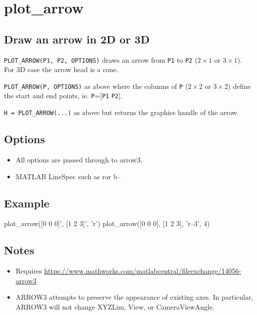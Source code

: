 \hypertarget{plot\_arrow}{\section*{plot\_arrow}}
\subsection*{Draw an arrow in 2D or 3D}


\texttt{PLOT\_ARROW(P1, P2, OPTIONS)} draws an arrow from \texttt{P1} to \texttt{P2} ($2 \times 1$ or $3 \times 1$).  For 3D
case the arrow head is a cone.



\texttt{PLOT\_ARROW(P, OPTIONS)} as above where the columns of \texttt{P} ($2 \times 2$ or $3 \times 2$) define the
start and end points, ie. \texttt{P}=[\texttt{P1} \texttt{P2}].



\texttt{H = PLOT\_ARROW(...)} as above but returns the graphics handle of the arrow.


\subsection*{Options}
\begin{itemize}
  \item All options are passed through to arrow3.
  \item MATLAB LineSpec such as \textquotesingle r\textquotesingle  or \textquotesingle b--\textquotesingle 
\end{itemize}

\subsection*{Example}
\begin{Code}
   plot_arrow([0 0 0]', [1 2 3]', 'r')  %
   plot_arrow([0 0 0], [1 2 3], 'r--3', 4) %

\end{Code}

\subsection*{Notes}
\begin{itemize}
  \item Requires \url{https://www.mathworks.com/matlabcentral/fileexchange/14056-arrow3}
  \item ARROW3 attempts to preserve the appearance of existing axes.  In    particular, ARROW3 will not change XYZLim, View, or CameraViewAngle.
\end{itemize}

